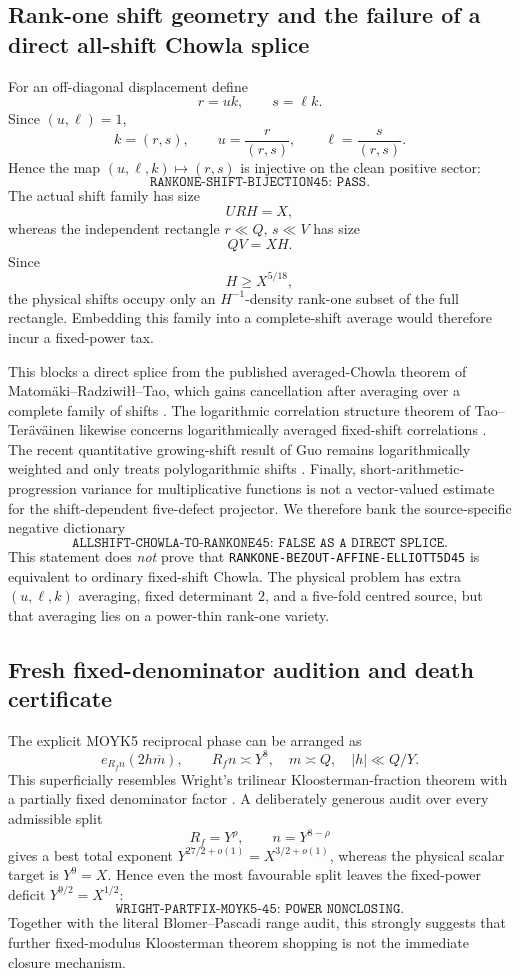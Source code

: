 \documentclass[11pt]{article}
\theoremstyle{definition}
\newcommand{\1}{\mathbf 1}
\begin{document}
\subsection{Rank-one shift geometry and the failure of a direct all-shift Chowla splice}
For an off-diagonal displacement define
\[
 r=uk,\qquad s=\ell k.
\]
Since $(u,\ell)=1$,
\[
 k=(r,s),\qquad u=\frac r{(r,s)},\qquad
 \ell=\frac s{(r,s)}.
\]
Hence the map $(u,\ell,k)\mapsto(r,s)$ is injective on the clean positive
sector:
\[
 \boxed{\texttt{RANKONE-SHIFT-BIJECTION45: PASS}}.
\]
The actual shift family has size
\[
 URH=X,
\]
whereas the independent rectangle $r\ll Q$, $s\ll V$ has size
\[
 QV=XH.
\]
Since
\[
 H\ge X^{5/18},
\]
the physical shifts occupy only an $H^{-1}$-density rank-one subset of the
full rectangle.  Embedding this family into a complete-shift average would
therefore incur a fixed-power tax.

This blocks a direct splice from the published averaged-Chowla theorem of
Matom\"aki--Radziwi\l\l--Tao, which gains cancellation after averaging over a
complete family of shifts \cite{MatomakiRadziwillTao2015}.  The logarithmic
correlation structure theorem of Tao--Ter\"av\"ainen likewise concerns
logarithmically averaged fixed-shift correlations \cite{TaoTeravainen2017}.
The recent quantitative growing-shift result of Guo remains logarithmically
weighted and only treats polylogarithmic shifts \cite{Guo2026}.  Finally,
short-arithmetic-progression variance for multiplicative functions
\cite{KlurmanMangerelTeravainen2019} is not a vector-valued estimate for the
shift-dependent five-defect projector.  We therefore bank the source-specific
negative dictionary
\[
 \boxed{\texttt{ALLSHIFT-CHOWLA-TO-RANKONE45: FALSE AS A DIRECT SPLICE}}.
\]
This statement does \emph{not} prove that
\texttt{RANKONE-BEZOUT-AFFINE-ELLIOTT5D45} is equivalent to ordinary
fixed-shift Chowla.  The physical problem has extra $(u,\ell,k)$ averaging,
fixed determinant $2$, and a five-fold centred source, but that averaging lies
on a power-thin rank-one variety.

\subsection{Fresh fixed-denominator audition and death certificate}
The explicit MOYK5 reciprocal phase can be arranged as
\[
 e_{R_fn}(2h\overline m),
 \qquad
 R_fn\asymp Y^8,\quad m\asymp Q,\quad |h|\ll Q/Y.
\]
This superficially resembles Wright's trilinear Kloosterman-fraction theorem
with a partially fixed denominator factor \cite{Wright2026}.  A deliberately
generous audit over every admissible split
\[
 R_f=Y^\rho,\qquad n=Y^{8-\rho}
\]
gives a best total exponent $Y^{27/2+o(1)}=X^{3/2+o(1)}$, whereas the physical
scalar target is $Y^9=X$.  Hence even the most favourable split leaves the
fixed-power deficit $Y^{9/2}=X^{1/2}$:
\[
 \boxed{\texttt{WRIGHT-PARTFIX-MOYK5-45: POWER NONCLOSING}}.
\]
Together with the literal Blomer--Pascadi range audit, this strongly suggests
that further fixed-modulus Kloosterman theorem shopping is not the immediate
closure mechanism.
\end{document}
